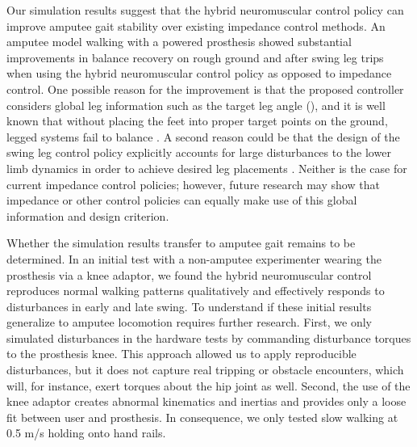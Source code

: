 Our simulation results suggest that the hybrid neuromuscular control policy can
improve amputee gait stability over existing impedance control methods. An
amputee model walking with a powered prosthesis showed substantial improvements
in balance recovery on rough ground and after swing leg trips when using the
hybrid neuromuscular control policy as opposed to impedance control.  One
possible reason for the improvement is that the proposed controller considers
global leg information such as the target leg angle
(), and it is well known that without placing
the feet into proper target points on the ground, legged systems fail to balance
\citep{townsend1985biped,raibert1986legged,kajita20013d,
seyfarth2002movement,pratt2006capture,wu20133}. A second reason could be that
the design of the swing leg control policy explicitly accounts for large
disturbances to the lower limb dynamics in order to achieve desired leg
placements \citep{desai2012robust}. Neither is the case for current impedance
control policies; however, future research may show that impedance or other
control policies can equally make use of this global information and design
criterion.

Whether the simulation results transfer to amputee gait remains to be
determined. In an initial test with a non-amputee experimenter wearing the
prosthesis via a knee adaptor, we found the hybrid neuromuscular control
reproduces normal walking patterns qualitatively and effectively responds to
disturbances in early and late swing. To understand if these initial results
generalize to amputee locomotion requires further research. First, we only
simulated disturbances in the hardware tests by commanding disturbance torques
to the prosthesis knee. This approach allowed us to apply reproducible
disturbances, but it does not capture real tripping or obstacle encounters,
which will, for instance, exert torques about the hip joint as well.  Second,
the use of the knee adaptor creates abnormal kinematics and inertias and
provides only a loose fit between user and prosthesis. In consequence, we only
tested slow walking at 0.5 m/s holding onto hand rails.

